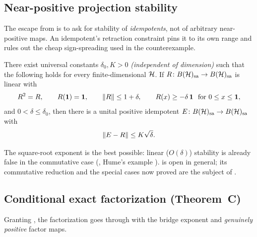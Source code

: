 \subsection{Near-positive projection stability}

The escape from  is to ask for stability of
\emph{idempotents}, not of arbitrary near-positive maps. An idempotent's
retraction constraint pins it to its own range and rules out the cheap
sign-spreading used in the counterexample.

\begin{openproblem}\label{op:npps}
There exist universal constants $\delta_0,K>0$ \emph{(independent of dimension)}
such that the following holds for every finite-dimensional $\mathcal{H}$. If
$R\colon B(\mathcal{H})_{\mathrm{sa}}\to B(\mathcal{H})_{\mathrm{sa}}$ is linear with
\[
  R^2=R,\qquad R(\mathbf{1})=\mathbf{1},\qquad \lVert R \rVert\le1+\delta,\qquad
  R(x)\ge-\delta\,\mathbf{1}\ \text{ for }0\le x\le\mathbf{1},
\]
and $0<\delta\le\delta_0$, then there is a unital positive idempotent
$E\colon B(\mathcal{H})_{\mathrm{sa}}\to B(\mathcal{H})_{\mathrm{sa}}$ with
\[
  \lVert E-R \rVert\le K\sqrt{\delta}.
\]
\end{openproblem}

The square-root exponent is the best possible: linear ($O(\delta)$) stability is
already false in the commutative case (, Hume's example
).  is open in general; its commutative reduction and
the special cases now proved are the subject of .

\subsection{Conditional exact factorization (Theorem~C)}

Granting , the factorization goes through with the bridge exponent
and \emph{genuinely positive} factor maps.

